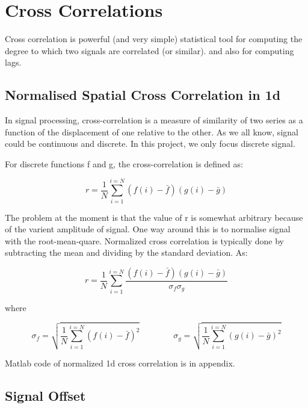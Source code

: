 \chapter{Cross Correlations}\label{part: cross correlations}

Cross correlation is powerful (and very simple) statistical tool for computing the degree to which two signals are correlated (or similar). and also for computing lags.  

\section{Normalised Spatial Cross Correlation in 1d}

In signal processing, cross-correlation is a measure of similarity of two series as a function of the displacement of one relative to the other. As we all know, signal could be continuous and discrete. In this project, we only focus discrete signal. 

For discrete functions f and g, the cross-correlation is defined as:

\begin{equation*}
r=\frac{1}{N}
\sum_{i=1}^{i=N}(f(i)-\bar{f})(g(i)-\bar{g})
\end{equation*}

The problem at the moment is that the value of r is somewhat arbitrary because of the varient amplitude of signal. One way around this is to normalise signal with the root-mean-quare. Normalized cross correlation is typically done by subtracting the mean and dividing by the standard deviation. As:

\begin{equation*}
r=\frac{1}{N}
\sum_{i=1}^{i=N}
\frac{(f(i)-\bar{f})(g(i)-\bar{g})}{\sigma _{f}\sigma _{g}}
\end{equation*}

where

\begin{equation*}
{\sigma _{f}}=
\sqrt{\frac{1}{N}\sum_{i=1}^{i=N}(f(i)-\bar{f})^{2}}
\hspace{4em}
{\sigma _{g}}=
\sqrt{\frac{1}{N}\sum_{i=1}^{i=N}(g(i)-\bar{g})^{2}}
\end{equation*}

Matlab code of normalized 1d cross correlation is in appendix.


\section{Signal Offset}

